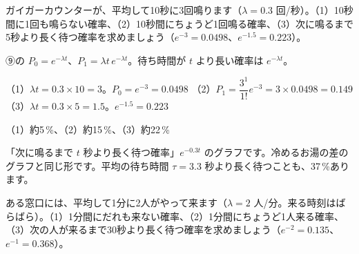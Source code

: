 \begin{reidai}[待ち時間と回数の確率]
ガイガーカウンターが、平均して10秒に3回鳴ります（$\lambda=0.3$ 回/秒）。（1）10秒間に1回も鳴らない確率、（2）10秒間にちょうど1回鳴る確率、（3）次に鳴るまで5秒より長く待つ確率を求めましょう（$e^{-3}=0.0498$、$e^{-1.5}=0.223$）。\par
\kangaekata ⑨の $P_0=e^{-\lambda t}$、$P_1=\lambda t\,e^{-\lambda t}$。待ち時間が $t$ より長い確率は $e^{-\lambda t}$。\par
\shiki（1）$\lambda t=0.3\times10=3$。$P_0=e^{-3}=0.0498$\bkvieq
（2）$P_1=\dfrac{3^1}{1!}e^{-3}=3\times0.0498=0.149$\bkvieq
（3）$\lambda t=0.3\times5=1.5$。$e^{-1.5}=0.223$\par
\kotae（1）約5\,\%、（2）約15\,\%、（3）約22\,\%
\end{reidai}
\noindent\begin{minipage}[c]{0.5\linewidth}
\end{minipage}\hfill
\begin{minipage}[c]{0.46\linewidth}\raggedright
「次に鳴るまで $t$ 秒より長く待つ確率」$e^{-0.3t}$ のグラフです。冷めるお湯の差のグラフと同じ形です。平均の待ち時間 $\tau=3.3$ 秒より長く待つことも、37\,\%あります。
\end{minipage}
\par\vspace{4pt}

\begin{jibun}
ある窓口には、平均して1分に2人がやって来ます（$\lambda=2$ 人/分。来る時刻はばらばら）。（1）1分間にだれも来ない確率、（2）1分間にちょうど1人来る確率、（3）次の人が来るまで30秒より長く待つ確率を求めましょう（$e^{-2}=0.135$、$e^{-1}=0.368$）。
\end{jibun}

